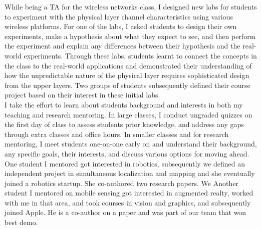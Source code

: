 \documentclass[10pt]{article}
\begin{document}
While being a TA for the wireless networks class, I designed new labs for students to experiment with the physical layer channel characteristics using various wireless platforms. 
For one of the labs, I asked students to design their own experiments, make a hypothesis about what they expect to see, and then perform the experiment and explain any differences between their hypothesis and the real-world experiments. %
Through these labs, students learnt to connect the concepts in the class to the real-world applications and demonstrated their understanding of how the unpredictable nature of the physical layer requires sophisticated design from the upper layers. Two groups of students subsequently defined their course project based on their interest in these initial labs. \\ 

I take the effort to learn about students background and interests in both my teaching and research mentoring. In large classes, I conduct ungraded quizzes on the first day of class to assess students prior knowledge, and address any gaps through extra classes and office hours. In smaller classes and for research mentoring, I meet students one-on-one early on and understand their background, any specific goals, their interests, and discuss various options for moving ahead. %
One student I mentored got interested in robotics, subsequently we defined an independent project in simultaneous localization and mapping and she eventually joined a robotics startup. She co-authored two research papers. We Another student I mentored on mobile sensing got interested in augmented realty, worked with me in that area, and took courses in vision and graphics, and subsequently joined Apple. He is a co-author on a paper and was part of our team that won best demo. %
\end{document}
